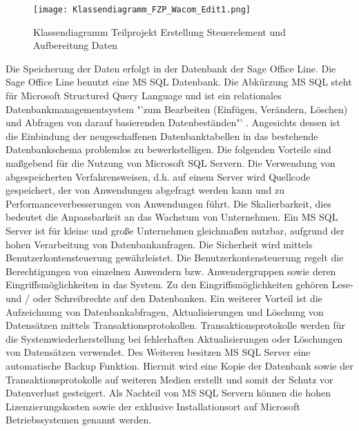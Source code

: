 \begin{figure}[!ht]
    \centering
    \texttt{[image: Klassendiagramm\_FZP\_Wacom\_Edit1.png]}
    \caption[Klassendiagramm Erstellung Steuerelement und Aufbereitung Daten]{\small{Klassendiagramm Teilprojekt Erstellung Steuerelement und Aufbereitung Daten}}
\end{figure}
\newline
\pagebreak
\textbf{} %
\newline
Die Speicherung der Daten erfolgt in der Datenbank der Sage Office Line. Die Sage Office Line benutzt eine MS SQL Datenbank. Die Abkürzung MS SQL steht für Microsoft Structured Query Language und ist ein relationales Datenbankmanagementsystem "'zum Bearbeiten (Einfügen, Verändern, Löschen) und Abfragen von darauf basierenden Datenbeständen"' \cite{sql1} \cite{sql2}. Angesichts dessen ist die Einbindung der neugeschaffenen Datenbanktabellen in das bestehende Datenbankschema problemlos zu bewerkstelligen. Die folgenden Vorteile sind maßgebend für die Nutzung von Microsoft SQL Servern. Die Verwendung von abgespeicherten Verfahrensweisen, d.h. auf einem Server wird Quellcode  gespeichert, der von Anwendungen abgefragt werden kann und zu Performanceverbesserungen von Anwendungen führt. Die Skalierbarkeit, dies bedeutet die Anpassbarkeit an das Wachstum von Unternehmen. Ein MS SQL Server ist für kleine und große Unternehmen gleichmaßen nutzbar, aufgrund der hohen Verarbeitung von Datenbankanfragen. Die Sicherheit wird mittels Benutzerkontensteuerung gewährleistet. Die Benutzerkontensteuerung regelt die Berechtigungen von einzelnen Anwendern bzw. Anwendergruppen sowie deren Eingriffsmöglichkeiten in das System. Zu den Eingriffsmöglichkeiten gehören Lese- und / oder Schreibrechte auf den Datenbanken. Ein weiterer Vorteil ist die Aufzeichnung von Datenbankabfragen, Aktualisierungen und Löschung von Datensätzen mittels Transaktionsprotokollen. Transaktionsprotokolle werden für die Systemwiederherstellung bei fehlerhaften Aktualisierungen oder Löschungen von Datensätzen verwendet. Des Weiteren besitzen MS SQL Server eine automatische Backup Funktion. Hiermit wird eine Kopie der Datenbank sowie der Transaktionsprotokolle auf weiteren Medien erstellt und somit der Schutz vor Datenverlust gesteigert. Als Nachteil von MS SQL Servern können die hohen Lizenzierungskosten sowie der exklusive Installationsort auf Microsoft Betriebssystemen genannt werden. \cite{SQLv1}